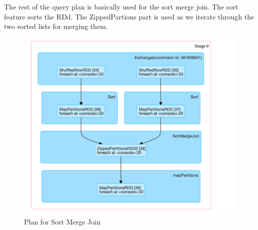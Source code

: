 The rest of the query plan is basically used for the sort merge join.
The sort feature sorts the RDd. The ZippedPartions part is used as we iterate through the two sorted
lists for merging them.
 
\begin{figure}[h]
\begin{center}
\includegraphics[scale=1.0]{./img/exchange.png}
\caption{Plan for Sort Merge Join}
\label{fig:exchange}
\end{center}
\end{figure}


